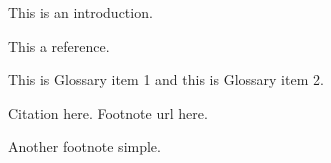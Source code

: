 
This is an introduction.

This a reference\citep{Li2019}.

This is \gls{Glossary item 1} and this is \gls{Glossary item 2}.

Citation here. Footnote url here.

Another footnote simple.

\putbib